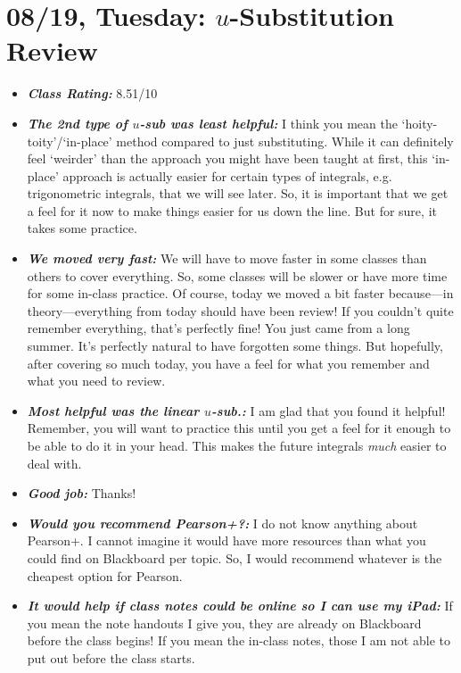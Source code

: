 \documentclass[11pt,letterpaper]{article}
\begin{document}
\newpage
\section*{08/19, Tuesday: $u$-Substitution Review\label{08-19}}

\begin{itemize}
\item {\bfseries\itshape Class Rating:} 8.51/10

\item {\bfseries\itshape The 2nd type of $u$-sub was least helpful:} I think you mean the `hoity-toity'/`in-place' method compared to just substituting. While it can definitely feel `weirder' than the approach you might have been taught at first, this `in-place' approach is actually easier for certain types of integrals, e.g. trigonometric integrals, that we will see later. So, it is important that we get a feel for it now to make things easier for us down the line. But for sure, it takes some practice. 

\item {\bfseries\itshape We moved very fast:} We will have to move faster in some classes than others to cover everything. So, some classes will be slower or have more time for some in-class practice. Of course, today we moved a bit faster because---in theory---everything from today should have been review! If you couldn't quite remember everything, that's perfectly fine! You just came from a long summer. It's perfectly natural to have forgotten some things. But hopefully, after covering so much today, you have a feel for what you remember and what you need to review. 

\item {\bfseries\itshape Most helpful was the linear $u$-sub.:} I am glad that you found it helpful! Remember, you will want to practice this until you get a feel for it enough to be able to do it in your head. This makes the future integrals \textit{much} easier to deal with. 

\item {\bfseries\itshape Good job:} Thanks! 

\item {\bfseries\itshape Would you recommend Pearson+?:} I do not know anything about Pearson+. I cannot imagine it would have more resources than what you could find on Blackboard per topic. So, I would recommend whatever is the cheapest option for Pearson. 

\item {\bfseries\itshape It would help if class notes could be online so I can use my iPad:} If you mean the note handouts I give you, they are already on Blackboard before the class begins! If you mean the in-class notes, those I am not able to put out before the class starts. 


\end{itemize}
\end{document}
